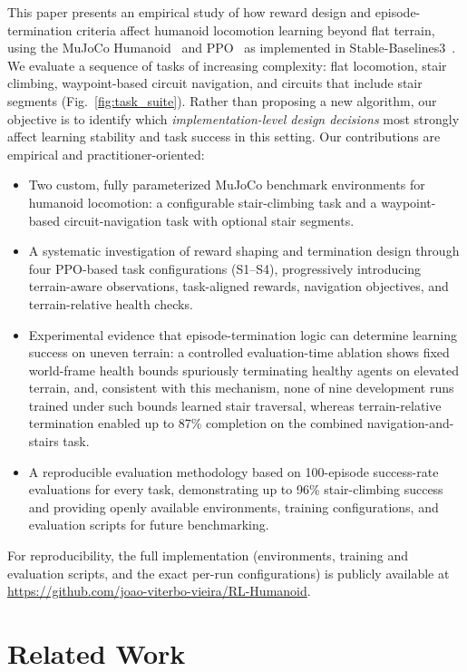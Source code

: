 \documentclass[conference,a4paper]{IEEEtran}
\begin{document}
This paper presents an empirical study of how reward design and episode-termination criteria affect humanoid locomotion learning beyond flat terrain, using the MuJoCo Humanoid~\cite{todorov2012mujoco,towers2024gymnasium} and PPO~\cite{schulman2017ppo} as implemented in Stable-Baselines3~\cite{raffin2021sb3}. We evaluate a sequence of tasks of increasing complexity: flat locomotion, stair climbing, waypoint-based circuit navigation, and circuits that include stair segments (Fig.~\ref{fig:task_suite}). Rather than proposing a new algorithm, our objective is to identify which \emph{implementation-level design decisions} most strongly affect learning stability and task success in this setting. Our contributions are empirical and practitioner-oriented:
\begin{itemize}
    \item Two custom, fully parameterized MuJoCo benchmark environments for humanoid locomotion: a configurable stair-climbing task and a waypoint-based circuit-navigation task with optional stair segments.
    \item A systematic investigation of reward shaping and termination design through four PPO-based task configurations (S1--S4), progressively introducing terrain-aware observations, task-aligned rewards, navigation objectives, and terrain-relative health checks.
    \item Experimental evidence that episode-termination logic can determine learning success on uneven terrain: a controlled evaluation-time ablation shows fixed world-frame health bounds spuriously terminating healthy agents on elevated terrain, and, consistent with this mechanism, none of nine development runs trained under such bounds learned stair traversal, whereas terrain-relative termination enabled up to 87\% completion on the combined navigation-and-stairs task.
    \item A reproducible evaluation methodology based on 100-episode success-rate evaluations for every task, demonstrating up to 96\% stair-climbing success and providing openly available environments, training configurations, and evaluation scripts for future benchmarking.
\end{itemize}
For reproducibility, the full implementation (environments, training and evaluation scripts, and the exact per-run configurations) is publicly available at \url{https://github.com/joao-viterbo-vieira/RL-Humanoid}.

\section{Related Work}
\label{sec:related}
\end{document}
